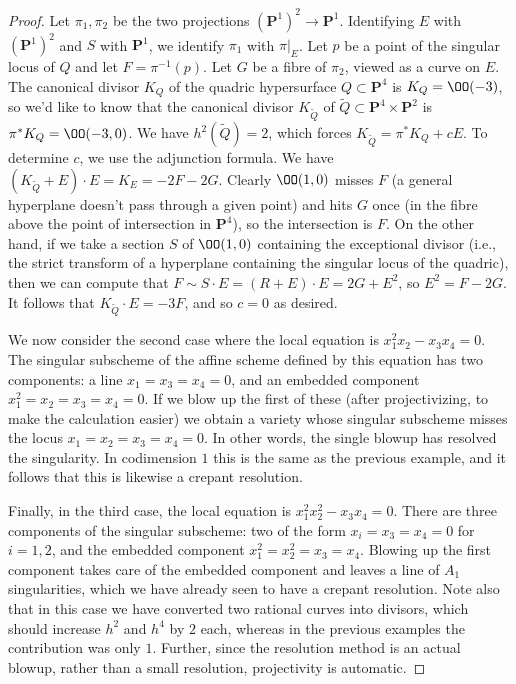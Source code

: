\documentclass{article}
\def\P{\mathbf{P}}
\begin{document}
\begin{proof}
Let $\pi_1, \pi_2$ be the two projections $(\P^1)^2 \to \P^1$.  Identifying
$E$ with $(\P^1)^2$ and $S$ with $\P^1$, we identify $\pi_1$ with $\pi\vert_E$.
Let $p$ be a point of the singular locus of $Q$ and let $F = \pi^{-1}(p)$.
Let $G$ be a fibre of $\pi_2$, viewed as a curve on $E$.
The canonical divisor $K_Q$ of the quadric hypersurface $Q\subset \P^4$ is $K_Q=\OO(-3)$, so we'd like
  to know that the canonical divisor $K_{\tilde{Q}}$ of $\tilde Q\subset \P^4\times\P^2$ is $\pi^*K_Q=\OO(-3,0)$.  We have
  $h^2(\tilde Q) = 2$, which forces $K_{\tilde{Q}}=\pi^*K_Q + cE$. 
  To determine $c$, we use the adjunction formula.  We have
  $(K_{\tilde Q}+E) \cdot E = K_E = -2F - 2G$.  Clearly $\OO(1,0)$ misses $F$
  (a general hyperplane doesn't pass through a given point) and hits
  $G$ once (in the fibre above the point of intersection in $\P^4$), so the
  intersection is $F$.
  On the other hand, if we take a section $S$ of $\OO(1,0)$ containing the
  exceptional divisor (i.e., the strict transform of a hyperplane containing
  the singular locus of the quadric), then we can compute that
  $F \sim S \cdot E = (R+E)\cdot E = 2G + E^2$, so $E^2 = F - 2G$.  It
  follows that $K_{\tilde Q} \cdot E = -3F$, and so $c = 0$ as desired.

We now consider the second case where the local equation is
$x_1^2 x_2 - x_3 x_4 = 0$.
The singular subscheme of the affine scheme defined
by this equation has two components: a line $x_1 = x_3 = x_4 = 0$, and an
embedded component $x_1^2 = x_2 = x_3 = x_4 = 0$.  If we blow up the first
of these (after projectivizing, to make the calculation easier) we obtain
a variety whose singular subscheme misses the locus
$x_1 = x_2 = x_3 = x_4 = 0$.  In other words, the single blowup has resolved
the singularity.  In codimension $1$ this is the same as the previous example,
and it follows that this is likewise a crepant resolution.

Finally, in the third case, the local equation is $x_1^2 x_2^2 - x_3 x_4 = 0$.
There are three components of the singular subscheme: two of the form
$x_i = x_3 = x_4 = 0$ for $i = 1, 2$, and the embedded component
$x_1^2 = x_2^2 = x_3 = x_4$.  Blowing up the first component takes care of
the embedded component and leaves a line of $A_1$ singularities, which we
have already seen to have a crepant resolution.  Note also that in this
case we have converted two rational curves into divisors, which should
increase $h^2$ and $h^4$ by $2$ each, whereas in the previous examples
the contribution was only $1$.  Further, since the resolution method is an
actual blowup, rather than a small resolution, projectivity is automatic.
\end{proof}
\end{document}
